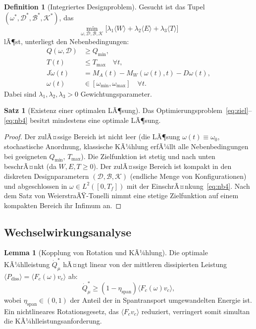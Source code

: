 ﻿\documentclass[a4paper,12pt]{article}
\theoremstyle{definition}
\newtheorem{definition}{Definition}
\newtheorem{satz}{Satz}
\newtheorem{lemma}{Lemma}
\begin{document}
\begin{definition}[Integriertes Designproblem]
\label{def:opt}
Gesucht ist das Tupel $(\omega^*, \mathcal{D}^*, \mathcal{B}^*, \mathcal{K}^*)$, das
\begin{equation}
\label{eq:ziel}
\min_{\omega, \mathcal{D}, \mathcal{B}, \mathcal{K}} \Big[ \lambda_1 \langle W \rangle + \lambda_2 \langle E \rangle + \lambda_3 \langle T \rangle \Big]
\end{equation}
lÃ¶st, unterliegt den Nebenbedingungen:
\begin{align}
Q(\omega, \mathcal{D}) &\geq Q_{\min}, \label{eq:nb1}\\
T(t) &\leq T_{\max} \quad \forall t, \label{eq:nb2}\\
J\dot{\omega}(t) &= M_A(t) - M_W(\omega(t),t) - D\omega(t), \label{eq:nb3}\\
\omega(t) &\in [\omega_{\min}, \omega_{\max}] \quad \forall t. \label{eq:nb4}
\end{align}
Dabei sind $\lambda_1, \lambda_2, \lambda_3 > 0$ Gewichtungsparameter.
\end{definition}

\begin{satz}[Existenz einer optimalen LÃ¶sung]
\label{satz:existenz}
Das Optimierungsproblem~\eqref{eq:ziel}--\eqref{eq:nb4} besitzt mindestens eine optimale LÃ¶sung.
\end{satz}

\begin{proof}
Der zulÃ¤ssige Bereich ist nicht leer (die LÃ¶sung $\omega(t) \equiv \omega_0$, stochastische
Anordnung, klassische KÃ¼hlung erfÃ¼llt alle Nebenbedingungen bei geeigneten $Q_{\min}$, $T_{\max}$).
Die Zielfunktion ist stetig und nach unten beschrÃ¤nkt (da $W, E, T \geq 0$). Der zulÃ¤ssige
Bereich ist kompakt in den diskreten Designparametern $(\mathcal{D}, \mathcal{B}, \mathcal{K})$
(endliche Menge von Konfigurationen) und abgeschlossen in $\omega \in L^2([0,T_f])$ mit der
EinschrÃ¤nkung~\eqref{eq:nb4}. Nach dem Satz von WeierstraÃŸ-Tonelli nimmt eine stetige
Zielfunktion auf einem kompakten Bereich ihr Infimum an.
\end{proof}

\subsection{Wechselwirkungsanalyse}

\begin{lemma}[Kopplung von Rotation und KÃ¼hlung]
\label{lem:kopplung}
Die optimale KÃ¼hlleistung $\dot{Q}^*_{\mu}$ hÃ¤ngt linear von der mittleren
dissipierten Leistung $\langle P_{\mathrm{diss}} \rangle = \langle F_c(\omega) v_c \rangle$
ab:
\[
\dot{Q}^*_{\mu} \geq (1-\eta_{\mathrm{span}}) \langle F_c(\omega) v_c \rangle,
\]
wobei $\eta_{\mathrm{span}} \in (0,1)$ der Anteil der in Spantransport umgewandelten Energie ist.
Ein nichtlineares Rotationsgesetz, das $\langle F_c v_c \rangle$ reduziert, verringert
somit simultan die KÃ¼hlleistungsanforderung.
\end{lemma}
\end{document}
